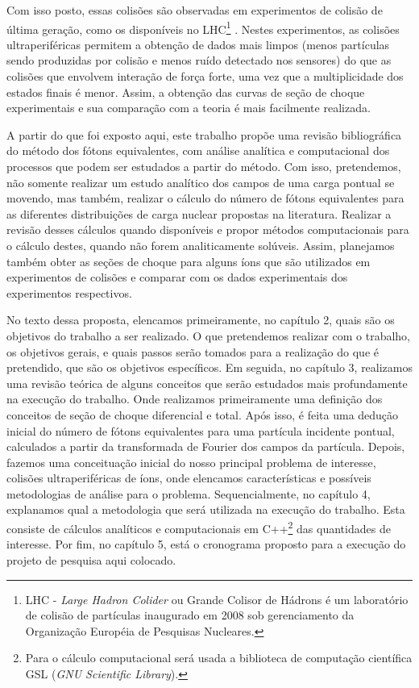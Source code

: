 Com isso posto, essas colisões são observadas em experimentos de colisão de
última geração, como os disponíveis no LHC\footnote{LHC - \textit{Large Hadron
Colider} ou Grande Colisor de Hádrons é um laboratório de colisão de partículas
inaugurado em 2008 sob gerenciamento da Organização Européia de Pesquisas
Nucleares.} \cite{BALTZ20081}. Nestes experimentos, as colisões
ultraperiféricas permitem a obtenção de dados mais limpos (menos partículas
sendo produzidas por colisão e menos ruído detectado nos sensores) do que as
colisões que envolvem interação de força forte, uma vez que a multiplicidade
dos estados finais é menor. Assim, a obtenção das curvas de seção de choque
experimentais e sua comparação com a teoria é mais facilmente realizada.

A partir do que foi exposto aqui, este trabalho propõe uma revisão
bibliográfica do método dos fótons equivalentes, com análise analítica e
computacional dos processos que podem ser estudados a partir do método. Com
isso, pretendemos, não somente realizar um estudo analítico dos campos de uma
carga pontual se movendo, mas também, realizar o cálculo do número de fótons
equivalentes para as diferentes distribuições de carga nuclear propostas na
literatura. Realizar a revisão desses cálculos quando disponíveis e propor
métodos computacionais para o cálculo destes, quando não forem analiticamente
solúveis. Assim, planejamos também obter as seções de choque para alguns íons
que são utilizados em experimentos de colisões e comparar com os dados
experimentais dos experimentos respectivos.

No texto dessa proposta, elencamos primeiramente, no capítulo 2, quais são os
objetivos do trabalho a ser realizado. O que pretendemos realizar com o
trabalho, os objetivos gerais, e quais passos serão tomados para a realização
do que é pretendido, que são os objetivos específicos. Em seguida, no capítulo
3, realizamos uma revisão teórica de alguns conceitos que serão estudados mais
profundamente na execução do trabalho. Onde realizamos primeiramente uma
definição dos conceitos de seção de choque diferencial e total. Após isso, é
feita uma dedução inicial do número de fótons equivalentes para uma partícula
incidente pontual, calculados a partir da transformada de Fourier dos campos da
partícula. Depois, fazemos uma conceituação inicial do nosso principal problema
de interesse, colisões ultraperiféricas de íons, onde elencamos características
e possíveis metodologias de análise para o problema. Sequencialmente, no
capítulo 4, explanamos qual a metodologia que será utilizada na execução do
trabalho. Esta consiste de cálculos analíticos e computacionais em
C++\footnote{Para o cálculo computacional será usada a biblioteca de computação
científica GSL (\textit{GNU Scientific Library}).} das quantidades de
interesse. Por fim, no capítulo 5, está o cronograma proposto para a execução
do projeto de pesquisa aqui colocado.




